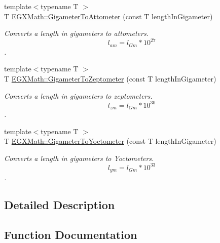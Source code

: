 \begin{DoxyCompactItemize}
{\footnotesize template$<$typename T $>$ }\\T \mbox{\hyperlink{group___e_g_x_math-_conversions-_length_conversions-_gigameter-_s_i_ga43e0ac7c59e4df08c27ed864c64e6008}{E\+G\+X\+Math\+::\+Gigameter\+To\+Attometer}} (const T length\+In\+Gigameter)
\begin{DoxyCompactList}\small\item\em Converts a length in gigameters to attometers. \[ l_{am}=l_{Gm} * 10^{27} \]. \end{DoxyCompactList}\item 
{\footnotesize template$<$typename T $>$ }\\T \mbox{\hyperlink{group___e_g_x_math-_conversions-_length_conversions-_gigameter-_s_i_ga5013069156df55018bc5a7f57f236f08}{E\+G\+X\+Math\+::\+Gigameter\+To\+Zeptometer}} (const T length\+In\+Gigameter)
\begin{DoxyCompactList}\small\item\em Converts a length in gigameters to zeptometers. \[ l_{zm}=l_{Gm} * 10^{30} \]. \end{DoxyCompactList}\item 
{\footnotesize template$<$typename T $>$ }\\T \mbox{\hyperlink{group___e_g_x_math-_conversions-_length_conversions-_gigameter-_s_i_ga2eff69e0a00032c24617fde4ac30bd49}{E\+G\+X\+Math\+::\+Gigameter\+To\+Yoctometer}} (const T length\+In\+Gigameter)
\begin{DoxyCompactList}\small\item\em Converts a length in gigameters to Yoctometers. \[ l_{ym}=l_{Gm} * 10^{33} \]. \end{DoxyCompactList}\end{DoxyCompactItemize}


\subsection{Detailed Description}


\subsection{Function Documentation}
\mbox{\label{group___e_g_x_math-_conversions-_length_conversions-_gigameter-_s_i_ga43e0ac7c59e4df08c27ed864c64e6008}} 
